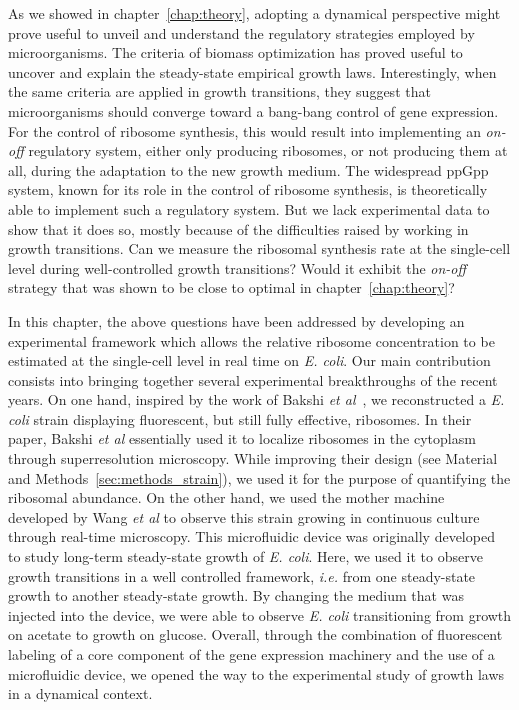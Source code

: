 As we showed in chapter~\ref{chap:theory}, adopting a dynamical perspective might prove useful to unveil and understand the regulatory strategies employed by microorganisms.
The criteria of biomass optimization has proved useful to uncover and explain the steady-state empirical growth laws.
Interestingly, when the same criteria are applied in growth transitions, they suggest that microorganisms should converge toward a bang-bang control of gene expression.
For the control of ribosome synthesis, this would result into implementing an \textit{on-off} regulatory system, either only producing ribosomes, or not producing them at all, during the adaptation to the new growth medium.
The widespread ppGpp system, known for its role in the control of ribosome synthesis, is theoretically able to implement such a regulatory system.
But we lack experimental data to show that it does so, mostly because of the difficulties raised by working in growth transitions.
Can we measure the ribosomal synthesis rate at the single-cell level during well-controlled growth transitions?
Would it exhibit the \textit{on-off} strategy that was shown to be close to optimal in chapter~\ref{chap:theory}?

In this chapter, the above questions have been addressed by developing an experimental framework which allows the relative ribosome concentration to be estimated at the single-cell level in real time on \textit{E. coli}.
Our main contribution consists into bringing together several experimental breakthroughs of the recent years.
On one hand, inspired by the work of Bakshi \textit{et al}~\cite{bakshi_superresolution_2012}, we reconstructed a \textit{E. coli} strain displaying fluorescent, but still fully effective, ribosomes.
In their paper, Bakshi \textit{et al} essentially used it to localize ribosomes in the cytoplasm through superresolution microscopy.
While improving their design (see Material and Methods~\ref{sec:methods_strain}), we used it for the purpose of quantifying the ribosomal abundance.
On the other hand, we used the mother machine~\cite{wang_robust_2010} developed by Wang \textit{et al} to observe this strain growing in continuous culture through real-time microscopy.
This microfluidic device was originally developed to study long-term steady-state growth of \textit{E. coli}.
Here, we used it to observe growth transitions in a well controlled framework, \textit{i.e.} from one steady-state growth to another steady-state growth.
By changing the medium that was injected into the device, we were able to observe \textit{E. coli} transitioning from growth on acetate to growth on glucose.
Overall, through the combination of fluorescent labeling of a core component of the gene expression machinery and the use of a microfluidic device, we opened the way to the experimental study of growth laws in a dynamical context.

